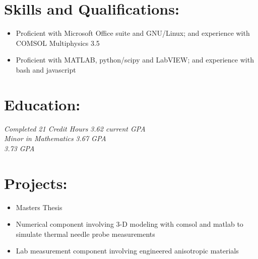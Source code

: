 \documentclass{resume}
\author{ Joshua Holbrook }
\begin{document}
\maketitle

\section{Skills and Qualifications:}
\small
\begin{itemize}
    \item Proficient with Microsoft Office suite and GNU/Linux; and experience with COMSOL Multiphysics 3.5
    \item Proficient with MATLAB, python/scipy and LabVIEW; and experience with bash and javascript

\end{itemize}
\normalsize

\section{Education:}
        \textit{Completed 21 Credit Hours}
        \emph{ 3.62 current GPA}\\
        
        \textit{Minor in Mathematics}
        \emph{ 3.67 GPA}\\
        
        \emph{ 3.73 GPA}\\

\section{Projects:}
    \small
    \begin{itemize}
        \item Masters Thesis
        \item Numerical component involving 3-D modeling with comsol and matlab to simulate thermal needle probe measurements
        \item Lab measurement component involving engineered anisotropic materials
    \end{itemize}
    \normalsize
\end{document}
